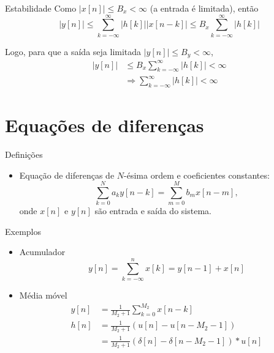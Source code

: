 \begin{slide}{Estabilidade}
    Como $|x[n]|\leq B_x < \infty$ (a entrada é limitada), então 
    \begin{equation*}|y[n]|\leq \sum_{k=-\infty}^{\infty} |h[k]||x[n-k]|\leq B_x\sum_{k=-\infty}^{\infty} |h[k]|\end{equation*}\pause
    
    Logo, para que a saída seja limitada $|y[n]|\leq B_y < \infty$,
    \begin{align*}|y[n]|&\leq B_x\sum_{k=-\infty}^{\infty} |h[k]| < \infty\\
                        &\Rightarrow \boxed{\sum_{k=-\infty}^{\infty} |h[k]| < \infty}
    \end{align*}
\end{slide}

\section[slide=true]{Equações de diferenças}
\begin{slide}[toc=]{Definições}
   \begin{itemize}
    \item Equação de diferenças de $N$-ésima ordem e coeficientes constantes:
    \begin{equation*}
       \sum_{ k = 0 }^{ N } a_k y[ n - k ]=\sum_{ m = 0 }^{ M } b_m x[ n - m ],
    \end{equation*}
    onde $x[n]$ e $y[n]$ são entrada e saída do sistema.
   \end{itemize}
\end{slide}

\begin{slide}[toc=]{Exemplos}
   \begin{itemize}
   \item Acumulador
    \begin{equation*}
         y[n] = \sum_{ k = -\infty}^{n} x[k]= y[n-1] + x[n]
   \end{equation*}\pause
    \item Média móvel
    \begin{align*}
         y[n] &= \frac{1}{M_2+1}\sum_{ k = 0}^{M_2} x[n-k]\\
         h[n] &= \frac{1}{M_2+1}\left ( u[n] - u[n-M_2-1] \right )\\
              &= \frac{1}{M_2+1}\left ( \delta[n] - \delta[n-M_2-1] \right )\ast u[n]
    \end{align*}
   \end{itemize}
\end{slide}


